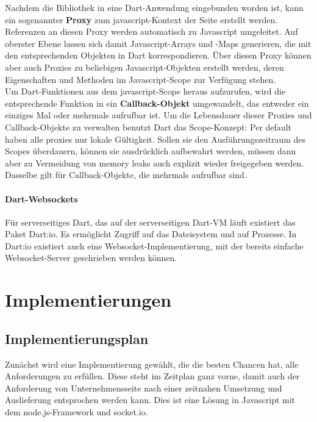 Nachdem die Bibliothek in eine Dart-Anwendung eingebunden worden ist, kann ein sogenannter {\bf Proxy} zum javascript-Kontext der Seite erstellt werden. Referenzen an diesen Proxy werden automatisch zu Javascript umgeleitet. Auf oberster Ebene lassen sich damit Javascript-Arrays und -Maps generieren, die mit den entsprechenden Objekten in Dart korrespondieren. Über diesen Proxy können aber auch Proxies zu beliebigen Javascript-Objekten erstellt werden, deren Eigenschaften und Methoden im Javascript-Scope zur Verfügung stehen.\\

Um Dart-Funktionen aus dem javascript-Scope heraus aufzurufen, wird die entsprechende Funktion in ein {\bf Callback-Objekt} umgewandelt, das entweder ein einziges Mal oder mehrmals aufrufbar ist. Um die Lebensdauer dieser Proxies und Callback-Objekte zu verwalten benutzt Dart das Scope-Konzept: Per default haben alle proxies nur lokale Gültigkeit. Sollen sie den Ausführungszeitraum des Scopes überdauern, können sie ausdrücklich aufbewahrt werden, müssen dann aber zu Vermeidung von memory leaks auch explizit wieder freigegeben werden. Dasselbe gilt für Callback-Objekte, die mehrmals aufrufbar sind.

\subsubsection{Dart-Websockets}
Für serverseitiges Dart, das auf der serverseitigen Dart-VM läuft existiert das Paket Dart:io. Es ermöglicht Zugriff auf das Dateisystem und auf Prozesse. In Dart:io existiert auch eine Websocket-Implementierung, mit der bereits einfache Websocket-Server geschrieben werden können.




\chapter{Implementierungen}\label{s.Implementierungen}

\section{Implementierungsplan}

Zunächst wird eine Implementierung gewählt, die die besten Chancen hat, alle Anforderungen zu erfüllen. Diese steht im Zeitplan ganz vorne, damit auch der Anforderung von Unternehmensseite nach einer zeitnahen Umsetzung und Auslieferung entsprochen werden kann.
Dies ist eine Lösung in Javascript mit dem node.js-Framework und socket.io. 


